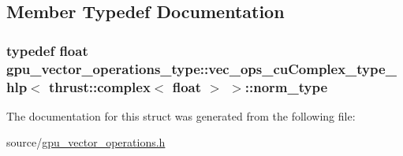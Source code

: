 \subsection{Member Typedef Documentation}
\hypertarget{structgpu__vector__operations__type_1_1vec__ops__cuComplex__type__hlp_3_01thrust_1_1complex_3_01float_01_4_01_4_ae6e9e0983048687ad977884788833222}{
\subsubsection[{norm\-\_\-type}]{\setlength{\rightskip}{0pt plus 5cm}typedef float {\bf gpu\-\_\-vector\-\_\-operations\-\_\-type\-::vec\-\_\-ops\-\_\-cu\-Complex\-\_\-type\-\_\-hlp}$<$ {\bf thrust\-::complex}$<$ float $>$ $>$\-::{\bf norm\-\_\-type}}}\label{structgpu__vector__operations__type_1_1vec__ops__cuComplex__type__hlp_3_01thrust_1_1complex_3_01float_01_4_01_4_ae6e9e0983048687ad977884788833222}


The documentation for this struct was generated from the following file\-:\begin{DoxyCompactItemize}
\item 
source/\hyperlink{gpu__vector__operations_8h}{gpu\-\_\-vector\-\_\-operations.\-h}\end{DoxyCompactItemize}
